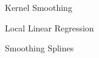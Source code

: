 \begin{sectionbox}\nospacing
    \begin{circlelistnosep}
        \item Kernel Smoothing
        \item Local Linear Regression
        \item Smoothing Splines
    \end{circlelistnosep}
\end{sectionbox}
